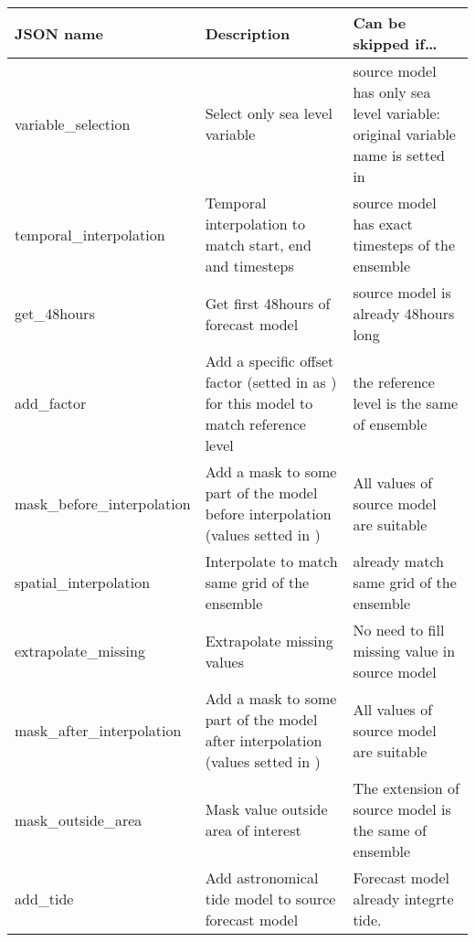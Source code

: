 \documentclass[letterpaper,10pt,english]{sphinxmanual}
\begin{document}
\begin{savenotes}\sphinxattablestart
\centering
{}
\sphinxthecaptionisattop
{}\label{\detokenize{configuration/index:id1}}
\sphinxaftertopcaption
\begin{tabulary}{\linewidth}[t]{|T|T|T|}
\hline
\sphinxstyletheadfamily 
JSON name
&\sphinxstyletheadfamily 
Description
&\sphinxstyletheadfamily 
Can be skipped if…
\\
\hline
variable\_selection
&
Select only sea level variable
&
source model has only sea level variable: original variable name is setted in {\hyperref[\detokenize{configuration/index:src-config}]{}}
\\
\hline
temporal\_interpolation
&
Temporal interpolation to match start, end and timesteps
&
source model has exact timesteps of the ensemble
\\
\hline
get\_48hours
&
Get first 48hours of forecast model
&
source model is already 48hours long
\\
\hline
add\_factor
&
Add a specific  offset factor (setted in {\hyperref[\detokenize{configuration/index:src-config}]{}} as ) for this model to match reference level
&
the reference level is the same  of ensemble
\\
\hline
mask\_before\_interpolation
&
Add a mask to some part of the model before interpolation (values setted in {\hyperref[\detokenize{configuration/index:src-config}]{}})
&
All values of source model are suitable
\\
\hline
spatial\_interpolation
&
Interpolate to match same grid of the ensemble
&
already match same grid of the ensemble
\\
\hline
extrapolate\_missing
&
Extrapolate missing values
&
No need to fill missing value in source model
\\
\hline
mask\_after\_interpolation
&
Add a mask to some part of the model after interpolation (values setted in {\hyperref[\detokenize{configuration/index:src-config}]{}})
&
All values of source model are suitable
\\
\hline
mask\_outside\_area
&
Mask value outside area of interest
&
The extension of source model is the same of ensemble
\\
\hline
add\_tide
&
Add astronomical tide model  to source forecast model
&
Forecast model already integrte tide.
\\
\hline
\end{tabulary}
\par
\sphinxattableend\end{savenotes}
\end{document}
